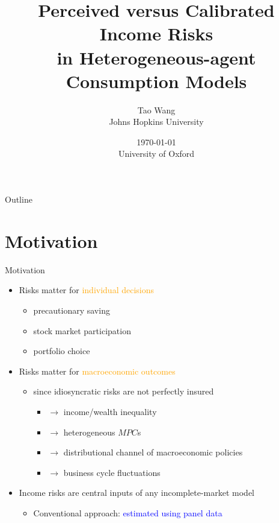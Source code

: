\documentclass{beamer}
\title{Perceived versus Calibrated Income Risks \\ in Heterogeneous-agent Consumption Models}
\author{Tao Wang \\ Johns Hopkins University}
\date{\today \\
	University of Oxford}
\begin{document}
	

\begin{frame}
	\titlepage
\end{frame}
\begin{frame}{Outline}
	\tableofcontents
\end{frame}


\section{Motivation}


\begin{frame}{Motivation}
	\begin{itemize}
		\item Risks matter for \textcolor{orange}{individual decisions}
		\begin{itemize}
			\item precautionary saving 
			\item stock market participation
			\item portfolio choice 
		\end{itemize} 
		\pause 
		\item Risks matter for \textcolor{orange}{macroeconomic outcomes}
		\begin{itemize}
			\item since idiosyncratic risks are not perfectly insured 
			\begin{itemize}
				\item $\rightarrow$ income/wealth inequality 
				\item $\rightarrow$ heterogeneous $MPC$s
				\item $\rightarrow$ distributional channel of macroeconomic policies 
				\item $\rightarrow$ business cycle fluctuations
			\end{itemize}
		\end{itemize}  %
		\pause
	\item Income risks are central inputs of any incomplete-market model   
	\begin{itemize}
		\item Conventional approach: \textcolor{blue}{estimated using panel data}

\end{itemize}
\end{itemize}
\end{frame}
\end{document}
